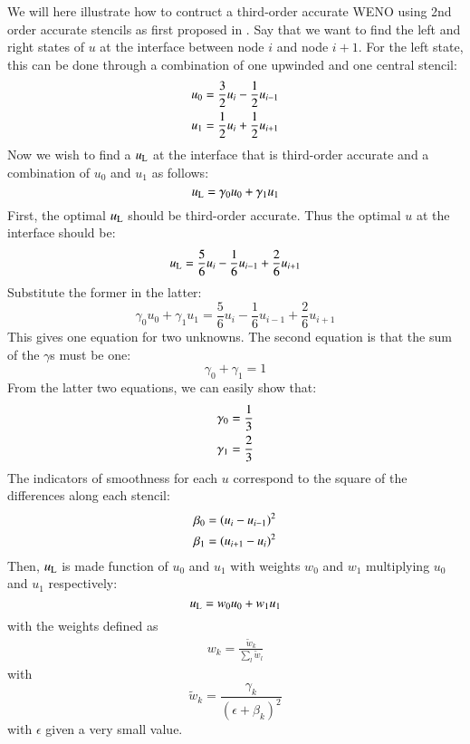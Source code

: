 \documentclass{warpdoc}
\newcommand{\alb}{\vspace{0.1cm}\\} %
\begin{document}
We will here illustrate how to contruct a third-order accurate WENO using 2nd order accurate stencils as first proposed in \cite{jcp:1994:liu}. 
Say that we want to find the left and right states of $u$ at the interface between node $i$ and node $i+1$. For the left state, this can be done through a combination of one upwinded and one central stencil:
%
\begin{align}
  u_0&=\frac{3}{2} u_{i} -\frac{1}{2} u_{i-1} \alb
  u_1&=\frac{1}{2} u_i + \frac{1}{2} u_{i+1}
\end{align}
%
Now we wish to find a $u_{\rm L}$ at the interface that is third-order accurate and a combination of $u_0$ and $u_1$ as follows:
%
\begin{equation}
  u_{\rm L}=\gamma_0 u_0 + \gamma_1 u_1
\end{equation}
%
First, the optimal $u_{\rm L}$ should be third-order accurate. Thus the optimal $u$ at the interface should be:
%
\begin{equation}
u_{\rm L}=\frac{5}{6} u_i - \frac{1}{6} u_{i-1} + \frac{2}{6} u_{i+1}
\end{equation}
%
Substitute the former in the latter:
%
\begin{equation}
\gamma_0 u_0 + \gamma_1 u_1 
 = 
\frac{5}{6} u_i - \frac{1}{6} u_{i-1} + \frac{2}{6} u_{i+1}
\end{equation}
%
This gives one equation for two unknowns. The second equation is that the sum of the $\gamma$s must be one:
%
\begin{equation}
\gamma_0+\gamma_1=1
\end{equation}
%
From the latter two equations, we can easily show that:
%
\begin{align}
\gamma_0&=\frac{1}{3}\alb
\gamma_1&=\frac{2}{3}
\end{align}
%
The indicators of smoothness for each $u$ correspond to the square of the differences along each stencil:
%
\begin{align}
\beta_0&=(u_i-u_{i-1})^2 \alb
\beta_1&=(u_{i+1}-u_{i})^2
\end{align}
%
Then, $u_{\rm L}$ is made function of $u_0$ and $u_1$ with weights $w_0$ and $w_1$ multiplying $u_0$ and $u_1$ respectively:
%
\begin{equation}
 u_{\rm L}=w_0 u_0 + w_1 u_1
\end{equation}
%
with the weights defined as
%
\begin{align}
w_k = \frac{\tilde{w}_k}{\sum_l \tilde{w}_l} 
\end{align}
%
with
%
\begin{equation}
 \tilde{w}_k=\frac{\gamma_k}{(\epsilon + \beta_k)^2}
\end{equation}
%
with $\epsilon$ given a very small value.







\appendix


  
  
\end{document}
